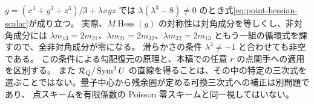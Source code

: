 \begin{remark}[明示的な非空条件と限界]
$g=(x^3+y^3+z^3)/3+\lambda xyz$ では
$\lambda(\lambda^3-8)\ne0$ のとき式\eqref{eq:point-hessian-scalar}が成り立つ。
実際、$M\operatorname{Hess}(g)$ の対称性は対角成分を等しくし、非対角成分には
$\lambda m_{13}=2m_{21}$、$\lambda m_{21}=2m_{32}$、$\lambda m_{32}=2m_{13}$
ともう一組の循環式を課すので、全非対角成分が零になる。
滑らかさの条件 $\lambda^3\ne-1$ と合わせても非空である。
この条件による勾配復元の原理と、本稿での任意 $r$ の点関手への適用を区別する。
また $\mathcal R_Q/\operatorname{Sym}^3U$ の直線を得ることは、その中の特定の三次式を
選ぶことではない。量子中心から残余圏が定める可換三次式への補正は別問題であり、
点スキームを有限係数の Poisson 零スキームと同一視してはいない。
\end{remark}
